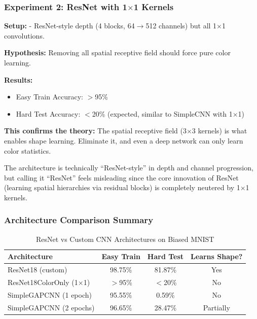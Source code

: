 \documentclass[9pt,a4paper,twocolumn,twoside]{tau-class/tau}
\begin{document}
        \subsubsection{Experiment 2: ResNet with 1$\times$1 Kernels}

        \textbf{Setup:}  - ResNet-style depth (4 blocks, 64$\rightarrow$512 channels) but all 1$\times$1 convolutions.

        \textbf{Hypothesis:} Removing all spatial receptive field should force pure color learning.

        \textbf{Results:}
        \begin{itemize}
            \item Easy Train Accuracy: $>$95\%
            \item Hard Test Accuracy: $<$20\% (expected, similar to SimpleCNN with 1$\times$1)
        \end{itemize}

        \begin{note}
            \textbf{This confirms the theory:} The spatial receptive field (3$\times$3 kernels) is what enables shape learning. Eliminate it, and even a deep network can only learn color statistics.

            The architecture is technically ``ResNet-style'' in depth and channel progression, but calling it ``ResNet'' feels misleading since the core innovation of ResNet (learning spatial hierarchies via residual blocks) is completely neutered by 1$\times$1 kernels.
        \end{note}

        \subsubsection{Architecture Comparison Summary}

        \begin{table}[H]
            \caption{ResNet vs Custom CNN Architectures on Biased MNIST}
            \label{tab:day5_resnet}
            \begin{tabular}{lccc}
            \toprule
            \textbf{Architecture} & \textbf{Easy Train} & \textbf{Hard Test} & \textbf{Learns Shape?} \\
            \midrule
            ResNet18 (custom) & 98.75\% & 81.87\% & Yes \\
            ResNet18ColorOnly (1$\times$1) & $>$95\% & $<$20\% & No \\
            SimpleGAPCNN (1 epoch) & 95.55\% & 0.59\% & No \\
            SimpleGAPCNN (2 epochs) & 96.65\% & 28.47\% & Partially \\
            \bottomrule
            \end{tabular}
        \end{table}
\end{document}

